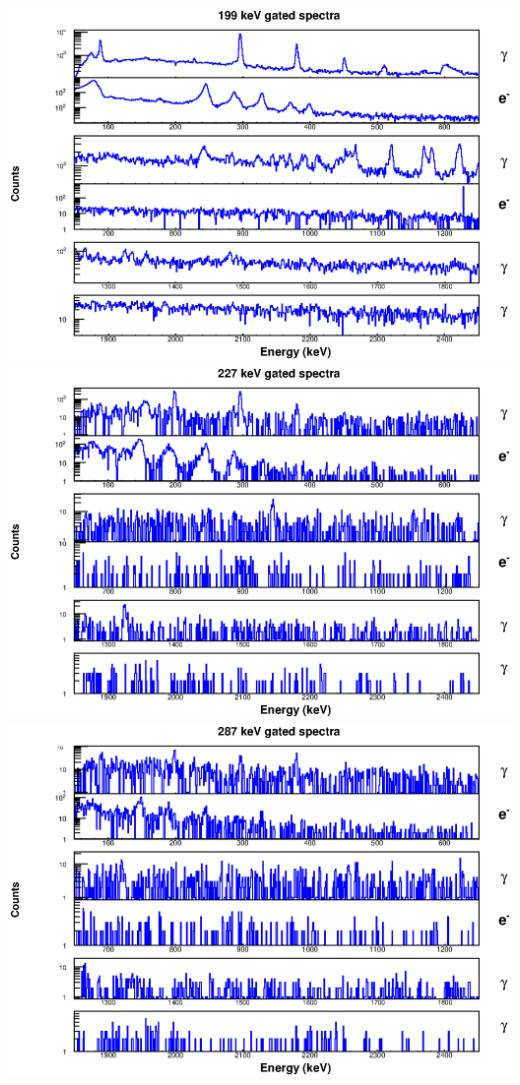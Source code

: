 \begin{landscape}
\includegraphics[scale=1.1]{156Gd_Appendix/199_combined.eps}
\includegraphics[scale=1.1]{156Gd_Appendix/227_combined.eps}
\includegraphics[scale=1.1]{156Gd_Appendix/287_combined.eps}

\end{landscape}
